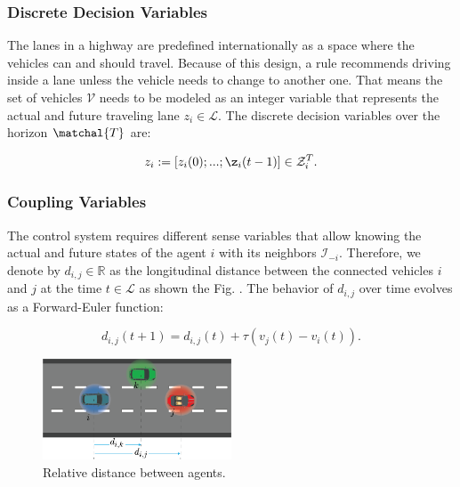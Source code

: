\subsubsection{Discrete Decision Variables}
The lanes in a highway are predefined internationally as a space where the vehicles can and should travel. Because of this design, a rule recommends driving inside a lane unless the vehicle needs to change to another one. That means the set of vehicles $\mathcal{V}$ needs to be modeled as an integer variable that represents the actual and future traveling lane $z_i \in \mathcal{L}$. The discrete decision variables over the horizon $\matchal{T}$ are:

\begin{gather*}
z_i := \left [ z_i(0); ...; \z_i(t-1) \right ] \in \mathcal{Z}^T_i.
\end{gather*}



\subsubsection{Coupling Variables}



The control system requires different sense variables that allow knowing the actual and future states of the agent $i$ with its neighbors $\mathcal{I}_{-i}$. Therefore, we denote by $d_{i,j} \in \mathbb{R}$ as the longitudinal distance between the connected vehicles $i$ and $j$ at the time $t \in \mathcal{L}$ as shown the Fig. \label{fig:variables}. The behavior of $d_{i,j}$ over time evolves as a Forward-Euler function:

\begin{equation}
d_{i,j}(t+1)= d_{i,j}(t) + \tau(v_j(t)-v_i(t)).
\label{eq:distance}
\end{equation}

\begin{figure}[H]
    \centering
    \includegraphics[width=0.5\textwidth]{Kap3/Asset 4.png}
    \caption{Relative distance between agents.}
    \label{fig:distance}
\end{figure}



